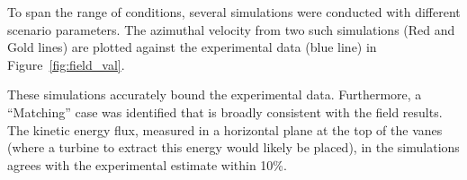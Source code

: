 To span the range of conditions, several simulations were conducted
with different scenario parameters. The azimuthal velocity from two such
simulations (Red and Gold lines) are plotted against the experimental
data (blue line) in Figure~\ref{fig:field_val}.  

These simulations accurately bound the experimental data. Furthermore, a
``Matching'' case was identified that is broadly consistent with the
field results. The kinetic energy flux, measured in a horizontal plane
at the top of the vanes (where a turbine to extract this energy would
likely be placed), in the simulations agrees with the experimental
estimate within 10\%. 

%
% 
%
% 
%
%
%
%
